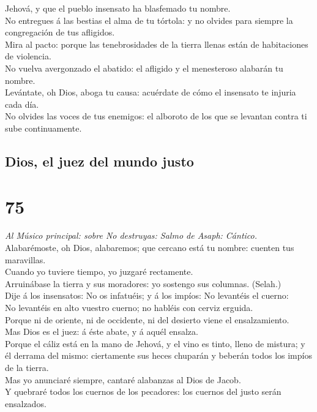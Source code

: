 Jehová, y que el pueblo insensato ha blasfemado tu nombre.\\
 No entregues á las bestias el alma de tu tórtola: y no
olvides para siempre la congregación de tus afligidos.\\
 Mira al pacto: porque las tenebrosidades de la tierra
llenas están de habitaciones de violencia.\\
 No vuelva avergonzado el abatido: el afligido y el
menesteroso alabarán tu nombre.\\
 Levántate, oh Dios, aboga tu causa: acuérdate de cómo el
insensato te injuria cada día.\\
 No olvides las voces de tus enemigos: el alboroto de los
que se levantan contra ti sube continuamente.

\hypertarget{dios-el-juez-del-mundo-justo}{%
\subsection{Dios, el juez del mundo
justo}\label{dios-el-juez-del-mundo-justo}}

\hypertarget{section-74}{%
\section{75}\label{section-74}}

 \emph{Al Músico principal: sobre No destruyas: Salmo de
Asaph: Cántico.}\\
Alabarémoste, oh Dios, alabaremos; que cercano está tu nombre: cuenten
tus maravillas.\\
 Cuando yo tuviere tiempo, yo juzgaré rectamente.\\
 Arruinábase la tierra y sus moradores: yo sostengo sus
columnas. (Selah.)\\
 Dije á los insensatos: No os infatuéis; y á los impíos: No
levantéis el cuerno:\\
 No levantéis en alto vuestro cuerno; no habléis con cerviz
erguida.\\
 Porque ni de oriente, ni de occidente, ni del desierto
viene el ensalzamiento.\\
 Mas Dios es el juez: á éste abate, y á aquél ensalza.\\
 Porque el cáliz está en la mano de Jehová, y el vino es
tinto, lleno de mistura; y él derrama del mismo: ciertamente sus heces
chuparán y beberán todos los impíos de la tierra.\\
 Mas yo anunciaré siempre, cantaré alabanzas al Dios de
Jacob.\\
 Y quebraré todos los cuernos de los pecadores: los cuernos
del justo serán ensalzados.

